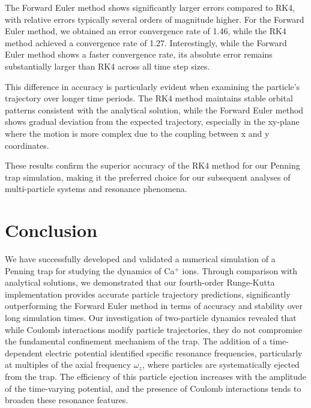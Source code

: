 \documentclass[english,notitlepage,reprint,nofootinbib]{revtex4-2}  %
\begin{document}
The Forward Euler method shows significantly larger errors compared to RK4, with relative errors typically several orders of magnitude higher. For the Forward Euler method, we obtained an error convergence rate of 1.46, while the RK4 method achieved a convergence rate of 1.27. Interestingly, while the Forward Euler method shows a faster convergence rate, its absolute error remains substantially larger than RK4 across all time step sizes.

This difference in accuracy is particularly evident when examining the particle's trajectory over longer time periods. The RK4 method maintains stable orbital patterns consistent with the analytical solution, while the Forward Euler method shows gradual deviation from the expected trajectory, especially in the xy-plane where the motion is more complex due to the coupling between x and y coordinates.

These results confirm the superior accuracy of the RK4 method for our Penning trap simulation, making it the preferred choice for our subsequent analyses of multi-particle systems and resonance phenomena.

\section{Conclusion}\label{sec:conclusion}
%

We have successfully developed and validated a numerical simulation of a Penning trap for studying the dynamics of Ca$^+$ ions. Through comparison with analytical solutions, we demonstrated that our fourth-order Runge-Kutta implementation provides accurate particle trajectory predictions, significantly outperforming the Forward Euler method in terms of accuracy and stability over long simulation times.
Our investigation of two-particle dynamics revealed that while Coulomb interactions modify particle trajectories, they do not compromise the fundamental confinement mechanism of the trap. The addition of a time-dependent electric potential identified specific resonance frequencies, particularly at multiples of the axial frequency $\omega_z$, where particles are systematically ejected from the trap. The efficiency of this particle ejection increases with the amplitude of the time-varying potential, and the presence of Coulomb interactions tends to broaden these resonance features.



\onecolumngrid
% 


\end{document}
